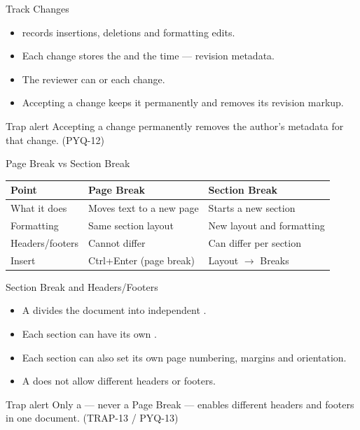 \documentclass[aspectratio=169]{beamer}
\begin{document}
\begin{frame}{Track Changes}
  \begin{itemize}
    \item {} records insertions, deletions and formatting
      edits.
    \item Each change stores the  and the time --- revision
      metadata.
    \item The reviewer can  or  each change.
    \item Accepting a change keeps it permanently and removes its revision
      markup.
  \end{itemize}
  \begin{alertblock}{Trap alert}
    Accepting a change permanently removes the author's metadata for that
    change. (PYQ-12)
  \end{alertblock}
\end{frame}

\begin{frame}{Page Break vs Section Break}
  \begin{center}
    \begin{tabular}{p{}p{}p{}}
      \toprule
      \textbf{Point} & \textbf{Page Break} & \textbf{Section Break} \\
      \midrule
      What it does & Moves text to a new page & Starts a new section \\
      Formatting & Same section layout & New layout and formatting \\
      Headers/footers & Cannot differ & Can differ per section \\
      Insert & Ctrl+Enter (page break) & Layout $\rightarrow$ Breaks \\
      \bottomrule
    \end{tabular}
  \end{center}
  \vspace{0.2cm}
\end{frame}

\begin{frame}{Section Break and Headers/Footers}
  \begin{itemize}
    \item A  divides the document into independent
      .
    \item Each section can have its own .
    \item Each section can also set its own page numbering, margins and
      orientation.
    \item A  does not allow different headers or footers.
  \end{itemize}
  \begin{alertblock}{Trap alert}
    Only a  --- never a Page Break --- enables different
    headers and footers in one document. (TRAP-13 / PYQ-13)
  \end{alertblock}
\end{frame}
\end{document}
